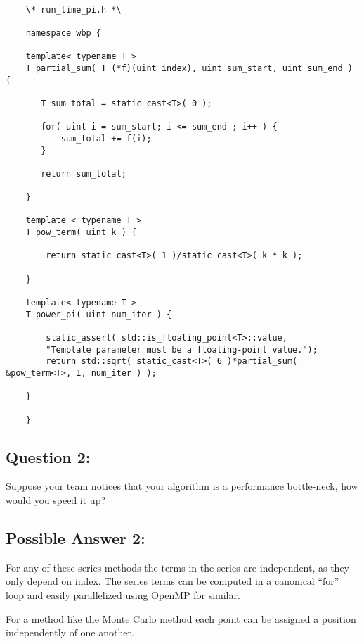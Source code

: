 \documentclass[letterpaper,11pt]{article}
\begin{document}
\begin{verbatim}

    \* run_time_pi.h *\

    namespace wbp {

    template< typename T >
    T partial_sum( T (*f)(uint index), uint sum_start, uint sum_end ) {

       T sum_total = static_cast<T>( 0 );

       for( uint i = sum_start; i <= sum_end ; i++ ) {
           sum_total += f(i);
       }

       return sum_total;

    }

    template < typename T >
    T pow_term( uint k ) {

        return static_cast<T>( 1 )/static_cast<T>( k * k );

    }

    template< typename T >
    T power_pi( uint num_iter ) {

        static_assert( std::is_floating_point<T>::value,
        "Template parameter must be a floating-point value.");
        return std::sqrt( static_cast<T>( 6 )*partial_sum( &pow_term<T>, 1, num_iter ) );

    }

    }
\end{verbatim}

\subsection*{Question 2:}

Suppose your team notices that your algorithm is a performance bottle-neck,
how would you speed it up?

\subsection*{Possible Answer 2:}

For any of these series methods the terms in the series are independent, as
 they only depend on index. The series terms can be computed in a canonical ``for''
  loop and easily parallelized using OpenMP for similar.

For a method like the Monte Carlo method each point can be assigned a position
independently of one another.
\end{document}
